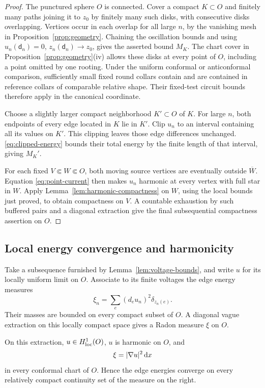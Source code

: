 \begin{proof}
The punctured sphere \(O\) is connected.  Cover a compact \(K\subset O\)
and finitely many paths joining it to \(z_0\) by finitely many such disks,
with consecutive disks overlapping.  Vertices occur in each overlap for
all large \(n\), by the vanishing mesh in
Proposition~\ref{prop:geometry}.  Chaining the oscillation bounds and using
\(u_n(\mathsf d_n)=0\), \(z_n(\mathsf d_n)\to z_0\), gives the asserted bound \(M_K\).
The chart cover in Proposition~\ref{prop:geometry}(iv) allows these disks
at every point of \(O\), including a point omitted by one rooting.  Under
the uniform conformal or anticonformal comparison, sufficiently small
fixed round collars contain and are contained in reference collars of
comparable relative shape.  Their fixed-test circuit bounds therefore
apply in the canonical coordinate.

Choose a slightly larger compact neighborhood \(K'\subset O\) of \(K\).
For large \(n\), both endpoints of every edge located in \(K\) lie in
\(K'\).  Clip \(u_n\) to an interval containing all its values on \(K'\).
This clipping leaves those edge differences unchanged.
\eqref{eq:clipped-energy} bounds their total energy by the finite length
of that interval, giving \(M_K'\).

For each fixed \(V\Subset W\Subset O\), both moving source vertices
are eventually outside \(\overline W\).  Equation
\eqref{eq:point-current} then makes \(u_n\) harmonic at every vertex
with full star in \(W\).  Apply Lemma~\ref{lem:harmonic-compactness}
on \(W\), using the local bounds just proved, to obtain compactness on
\(V\).  A countable exhaustion by such buffered pairs and a diagonal
extraction give the final subsequential compactness assertion on \(O\).
\end{proof}

\subsection{Local energy convergence and harmonicity}

Take a subsequence furnished by Lemma~\ref{lem:voltage-bounds}, and write
\(u\) for its locally uniform limit on \(O\).  Associate to its finite
voltages the edge energy measures
\[
             \xi_n=\sum_e(d_eu_n)^2\delta_{z_n(e)}.
\]
Their masses are bounded on every compact subset of \(O\).  A diagonal
vague extraction on this locally compact space gives a Radon measure
\(\xi\) on \(O\).

\begin{lemma}\label{lem:no-energy-defect}
On this extraction, \(u\in H^1_{\rm loc}(O)\), \(u\) is harmonic on \(O\),
and
\begin{equation}\label{eq:no-energy-defect}
                         \xi=\lvert \nabla u\rvert^2\,\mathrm d x
\end{equation}
in every conformal chart of \(O\).  Hence the edge energies converge on
every relatively compact continuity set of the measure on the right.
\end{lemma}

